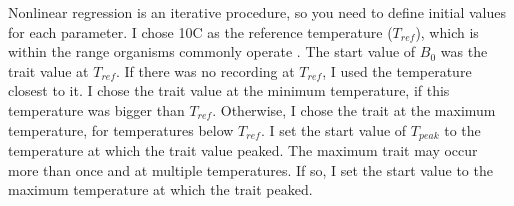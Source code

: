 \documentclass[11pt]{article}
\begin{document}



Nonlinear regression is an iterative procedure, so you need to define initial values for each parameter.
I chose 10\degree C as the reference temperature ($T_{ref}$), which is within the range organisms commonly operate \cite{SchoolfieldSharpe1981}.
The start value of $B_{0}$ was the trait value at $T_{ref}$. If there was no recording at $T_{ref}$, I used the temperature closest to it. I chose the trait value at the minimum temperature, if this temperature was bigger than $T_{ref}$. Otherwise, I chose the trait at the maximum temperature, for temperatures below $T_{ref}$.
I set the start value of $T_{peak}$ to the temperature at which the trait value peaked.
The maximum trait may occur more than once and at multiple temperatures.
If so, I set the start value to the maximum temperature at which the trait peaked.
\end{document}
